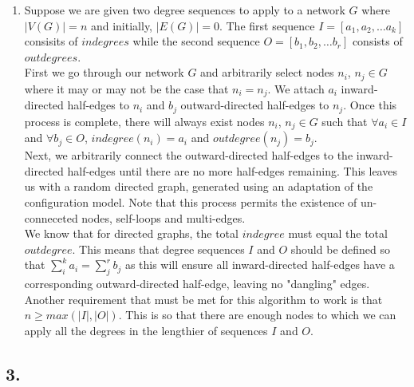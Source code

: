 \documentclass{article}
\begin{document}
    \begin{enumerate}[label=(\alph*), left=10pt, itemsep=10pt]
        \item \begin{minipage}[t]{0.9\textwidth}
            Suppose we are given two degree sequences to apply to a network $G$ where $|V(G)| = n$ and initially,
            $|E(G)| = 0$. The first sequence $I = [a_{1}, a_{2}, \dots a_{k}]$ consisits of $indegrees$ while the second sequence
            $O = [b_{1}, b_{2}, \dots b_{r}]$ consists of $outdegrees$.\\
            
            First we go through our network $G$ and arbitrarily select nodes $n_{i}$, $n_{j} \in G$ where it may or may not
            be the case that $n_{i} = n_{j}$. We attach $a_{i}$ inward-directed half-edges to $n_{i}$ and $b_{j}$
            outward-directed half-edges to $n_{j}$. Once this process is complete, there will always exist nodes $n_{i}$,
            $n_{j} \in G$ such that $\forall a_{i} \in I$ and $\forall b_{j} \in O$, $indegree(n_{i}) = a_{i}$ and
            $outdegree(n_{j}) = b_{j}$.\\
            
            Next, we arbitrarily connect the outward-directed half-edges to the inward-directed half-edges until there are
            no more half-edges remaining. This leaves us with a random directed graph, generated using an adaptation of
            the configuration model. Note that this process permits the existence of un-conneceted nodes, self-loops and
            multi-edges.\\

            We know that for directed graphs, the total $indegree$ must equal the total $outdegree$. This means that degree
            sequences $I$ and $O$ should be defined so that $\sum_{i}^{k} a_{i} = \sum_{j}^{r}b_{j}$ as this will ensure all
            inward-directed half-edges have a corresponding outward-directed half-edge, leaving no "dangling" edges.
            Another requirement that must be met for this algorithm to work is that $n \geq max(|I|,|O|)$. This is so that
            there are enough nodes to which we can apply all the degrees in the lengthier of sequences $I$ and $O$.  

        \end{minipage}
    \end{enumerate}

    \subsection*{3.}
\end{document}
